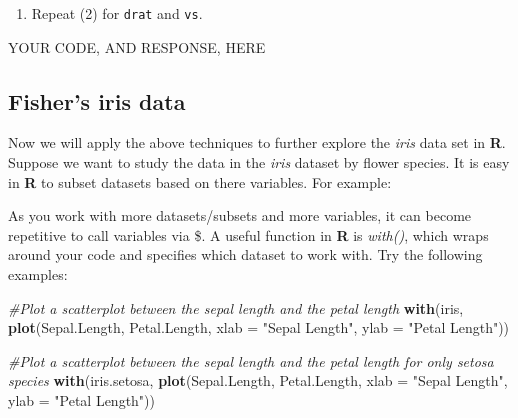 \documentclass[
]{article}
\newenvironment{Shaded}{\begin{snugshade}}{\end{snugshade}}
\newcommand{\CommentTok}[1]{\textcolor[rgb]{0.56,0.35,0.01}{\textit{#1}}}
\newcommand{\DataTypeTok}[1]{\textcolor[rgb]{0.13,0.29,0.53}{#1}}
\newcommand{\KeywordTok}[1]{\textcolor[rgb]{0.13,0.29,0.53}{\textbf{#1}}}
\newcommand{\NormalTok}[1]{#1}
\newcommand{\OperatorTok}[1]{\textcolor[rgb]{0.81,0.36,0.00}{\textbf{#1}}}
\newcommand{\StringTok}[1]{\textcolor[rgb]{0.31,0.60,0.02}{#1}}
\providecommand{\tightlist}{%
  \setlength{\itemsep}{0pt}\setlength{\parskip}{0pt}}
\begin{document}
\begin{enumerate}
\def\labelenumi{\arabic{enumi}.}
\setcounter{enumi}{2}
\tightlist
\item
  Repeat (2) for \texttt{drat} and \texttt{vs}.
\end{enumerate}

\begin{Shaded}
\begin{Highlighting}[]
\NormalTok{YOUR CODE, AND RESPONSE, HERE}
\end{Highlighting}
\end{Shaded}

\hypertarget{fishers-iris-data}{%
\subsection{Fisher's iris data}\label{fishers-iris-data}}

Now we will apply the above techniques to further explore the
\emph{iris} data set in \textbf{R}. Suppose we want to study the data in
the \emph{iris} dataset by flower species. It is easy in \textbf{R} to
subset datasets based on there variables. For example:

\begin{Shaded}
\end{Shaded}

As you work with more datasets/subsets and more variables, it can become
repetitive to call variables via \$. A useful function in \textbf{R} is
\emph{with()}, which wraps around your code and specifies which dataset
to work with. Try the following examples:

\begin{Shaded}
\begin{Highlighting}[]
\CommentTok{#Plot a scatterplot between the sepal length and the petal length}
\KeywordTok{with}\NormalTok{(iris, }
\KeywordTok{plot}\NormalTok{(Sepal.Length, Petal.Length, }\DataTypeTok{xlab =} \StringTok{"Sepal Length"}\NormalTok{, }\DataTypeTok{ylab =} \StringTok{"Petal Length"}\NormalTok{))}

\CommentTok{#Plot a scatterplot between the sepal length and the petal length for only setosa species}
\KeywordTok{with}\NormalTok{(iris.setosa, }
\KeywordTok{plot}\NormalTok{(Sepal.Length, Petal.Length, }\DataTypeTok{xlab =} \StringTok{"Sepal Length"}\NormalTok{, }\DataTypeTok{ylab =} \StringTok{"Petal Length"}\NormalTok{))}
\end{Highlighting}
\end{Shaded}
\end{document}
